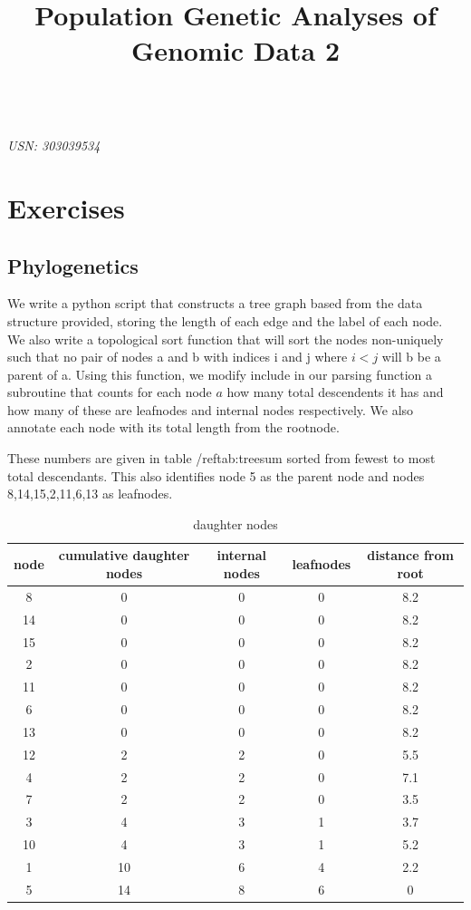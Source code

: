 \documentclass{article}
\title{Population Genetic Analyses of Genomic Data 2}
\begin{document}

\begin{center}
\textbf{\LARGE{}}\\
\textit{USN: 303039534}\\
\end{center}


\section{Exercises}




\subsection{Phylogenetics}

We write a python script that constructs a tree graph based from the data structure provided, storing the length of each edge and the label of each node. We also write a topological sort function that will sort the nodes non-uniquely such that no pair of nodes a and b with indices i and j where $i < j$ will b be a parent of a. Using this function, we modify include in our parsing function a subroutine that counts for each node $a$ how many total descendents it has and how many of these are leafnodes and internal nodes respectively. We also annotate each node with its total length from the rootnode.

These numbers are given in table /ref{tab:treesum} sorted from fewest to most total descendants. This also identifies node 5 as the parent node and nodes 8,14,15,2,11,6,13 as leafnodes.

\begin{table}[h]
\centering
\begin{tabular}{ |c|c|c|c|c|}
\hline
 node & cumulative daughter nodes & internal nodes & leafnodes & distance from root \\
\hline
8 & 0 & 0 & 0 & 8.2 \\
14 & 0 & 0 & 0 & 8.2 \\
15 & 0 & 0 & 0 & 8.2 \\
2 & 0 & 0 & 0 & 8.2 \\
11 & 0 & 0 & 0 & 8.2 \\
6 & 0 & 0 & 0 & 8.2 \\
13 & 0 & 0 & 0 & 8.2 \\
\hline
12 & 2 & 2 & 0 & 5.5 \\
4 & 2 & 2 & 0 & 7.1 \\
7 & 2 & 2 & 0 & 3.5 \\
3 & 4 & 3 & 1 & 3.7 \\
10 & 4 & 3 & 1 & 5.2 \\
1 & 10 & 6 & 4 & 2.2 \\
5 & 14 & 8 & 6 & 0 \\
\hline
\end{tabular}
\caption{daughter nodes}
\label{tab:treesum}
\end{table}
\end{document}
